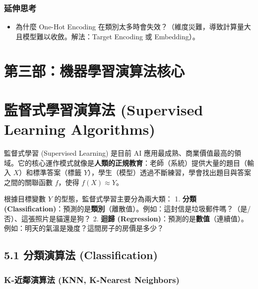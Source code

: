 \documentclass[
  letterpaper,
  DIV=11,
  numbers=noendperiod]{scrreprt}
\providecommand{\tightlist}{%
  \setlength{\itemsep}{0pt}\setlength{\parskip}{0pt}}
\begin{document}
\section{延伸思考}\label{ux5ef6ux4f38ux601dux8003-3}

\begin{itemize}
\tightlist
\item
  為什麼 One-Hot Encoding
  在類別太多時會失效？（維度災難，導致計算量大且模型難以收斂。解法：Target
  Encoding 或 Embedding）。
\end{itemize}

\part{第三部：機器學習演算法核心}

\part{監督式學習演算法 (Supervised Learning
Algorithms)}\label{ux76e3ux7763ux5f0fux5b78ux7fd2ux6f14ux7b97ux6cd5-supervised-learning-algorithms}

監督式學習 (Supervised Learning) 是目前 AI
應用最成熟、商業價值最高的領域。它的核心運作模式就像是\textbf{人類的正規教育}：老師（系統）提供大量的題目（輸入
\(X\)）和標準答案（標籤
\(Y\)），學生（模型）透過不斷練習，學會找出題目與答案之間的關聯函數
\(f\)，使得 \(f(X) \approx Y\)。

根據目標變數 \(Y\) 的型態，監督式學習主要分為兩大類： 1. \textbf{分類
(Classification)}：預測的是\textbf{類別}（離散值）。例如：這封信是垃圾郵件嗎？（是/否）、這張照片是貓還是狗？
2. \textbf{迴歸
(Regression)}：預測的是\textbf{數值}（連續值）。例如：明天的氣溫是幾度？這間房子的房價是多少？

\chapter{5.1 分類演算法 (Classification)}\label{sec-classification}

\section{K-近鄰演算法 (KNN, K-Nearest Neighbors)}\label{sec-knn}
\end{document}
